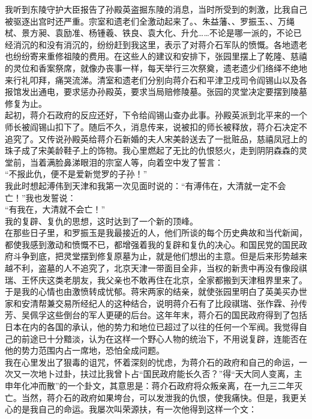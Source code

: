 我听到东陵守护大臣报告了孙殿英盗掘东陵的消息，当时所受到的刺激，比我自己被驱逐出宫时还严重。宗室和遗老们全激动起来了。、朱益藩、、罗振玉、、万绳栻、景方昶、袁励准、杨锺羲、铁良、袁大化、升允……不论是哪一派的，不论已经消沉的和没有消沉的，纷纷赶到我这里，表示了对蒋介石军队的愤慨。各地遗老也纷纷寄来重修祖陵的费用。在这些人的建议和安排下，张园里摆上了乾隆、慈禧的灵位和香案祭席，就像办丧事一样，每天举行三次祭奠，遗老遗少们络绎不绝地来行礼叩拜，痛哭流涕。清室和遗老们分别向蒋介石和平津卫戍司令阎锡山以及各报馆发出通电，要求惩办孙殿英，要求当局赔修陵墓。张园的灵堂决定要摆到陵墓修复为止。\\

起初，蒋介石政府的反应还好，下令给阎锡山查办此事。孙殿英派到北平来的一个师长被阎锡山扣下了。随后不久，消息传来，说被扣的师长被释放，蒋介石决定不追究了。又传说孙殿英给蒋介石新婚的夫人宋美龄送去了一批赃品，慈禧凤冠上的珠子成了宋美龄鞋子上的饰物。我心里燃起了无比的仇恨怒火，走到阴阴森森的灵堂前，当着满脸鼻涕眼泪的宗室人等，向着空中发了誓言：\\

“不报此仇，便不是爱新觉罗的子孙！”\\

我此时想起溥伟到天津和我第一次见面时说的：“有溥伟在，大清就一定不会亡！”我也发誓说：\\

“有我在，大清就不会亡！”\\

我的复辟、复仇的思想，这时达到了一个新的顶峰。\\

在那些日子里，和罗振玉是我最接近的人，他们所谈的每个历史典故和当代新闻，都使我感到激动和愤慨不已，都增强着我的复辟和复仇的决心。和国民党的国民政府斗争到底，把灵堂摆到修复原墓为止，就是他们想出的主意。但是后来形势越来越不利，盗墓的人不追究了，北京天津一带面目全非，当权的新贵中再没有像段祺瑞、王怀庆这类老朋友，我父亲也不敢再住在北京，全家都搬到天津租界里来了。于是我的心情也由激愤转成忧郁。蒋宋两家的结亲，就使张园里明白了英美买办世家和安清帮兼交易所经纪人的这种结合，说明蒋介石有了比段祺瑞、张作霖、孙传芳、吴佩孚这些倒台的军人更硬的后台。这年年末，蒋介石的国民政府得到了包括日本在内的各国的承认，他的势力和地位已超过了以往的任何一个军阀。我觉得自己的前途已十分黯淡，认为在这样一个野心人物的统治下，不用说复辟，连能否在他的势力范围内占一席地，恐怕全成问题。\\

我在心里发出了狠毒的诅咒，怀着深刻的忧虑，为蒋介石的政府和自己的命运，一次又一次地卜过卦，扶过比我曾卜占“国民政府能长久否？”得“天大同人变离，主申年化冲而散”的一个卦文，其意思是：蒋介石政府将众叛亲离，在一九三二年灭亡。当然，蒋介石的政府如果垮台，可以发泄我的仇恨，使我痛快。但是，我更关心的是我自己的命运。我屡次叫荣源扶，有一次他得到这样一个文：\\

